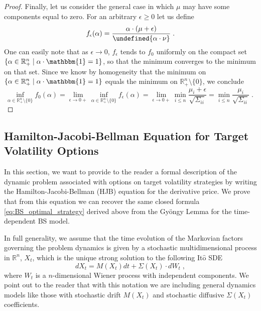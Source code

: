 \documentclass[11pt]{article}
\let\norm\undefined %
\DeclarePairedDelimiter\norm{\lVert}{\rVert}
\begin{document}
\begin{proof}
	Finally, let us consider the general case in which $\mu$ may have some components equal to zero. For an arbitrary $\epsilon \geq 0$ let us define
	\begin{equation}
	f_{\epsilon}(\alpha) = \frac{\alpha \cdot (\mu+\epsilon)}{\norm{\alpha \cdot \nu}} \; .
	\end{equation}
	One can easily note that as $\epsilon \to 0$, $f_{\epsilon}$ tends to $f_{0}$ uniformly on the compact set $\{\alpha \in \mathbb{R}^n_+ \mid \alpha \cdot \mathbbm{1} = 1\}$, so that the minimum converges to the minimum on that set. Since we know by homogeneity that the minimum on $\{\alpha \in \mathbb{R}^n_+ \mid \alpha \cdot \mathbbm{1} = 1\}$ equals the minimum on $\mathbb{R}^n_+ \setminus \{0\}$, we conclude
	\begin{equation}
	\inf_{\alpha \in \mathbb{R}_{+}^n \setminus \{0\}} f_0(\alpha) = 
	\lim_{\epsilon \to 0+} \inf_{\alpha \in \mathbb{R}_{+}^n \setminus \{0\}} f_{\epsilon}(\alpha) = 
	\lim_{\epsilon \to 0+} \min_{i\leq n} \frac{\mu_i+\epsilon}{\sqrt{\Sigma_{ii}}} =
	\min_{i\leq n} \frac{\mu_i}{\sqrt{\Sigma_{ii}}} \; . \; 
	\end{equation}
\end{proof}


\subsection{Hamilton-Jacobi-Bellman Equation for Target Volatility Options}\label{subsec:HJB}
In this section, we want to provide to the reader a formal description of the dynamic problem associated with options on target volatility strategies by writing the Hamilton-Jacobi-Bellman (HJB) equation for the derivative price. We prove that from this equation we can recover the same closed formula \eqref{eq:BS_optimal_strategy} derived above from the Gy\"ongy Lemma for the time-dependent BS model. 

In full generality, we assume that the time evolution of the Markovian factors governing the problem dynamics is given by  a stochastic multidimensional process in $\mathbb{R}^n$, $X_t$, which is the unique strong solution to the following It$\hat{\text{o}}$ SDE 
\begin{equation}
		dX_t = M(X_t)dt + \Sigma(X_t) \cdot dW_t \; ,
\end{equation}
where $W_t$ is a $n$-dimensional Wiener process with independent components. We point out to the reader that with this notation we are including general dynamics models like those with stochastic drift $M(X_t)$ and stochastic diffusive $\Sigma(X_t)$ coefficients. 
\end{document}
